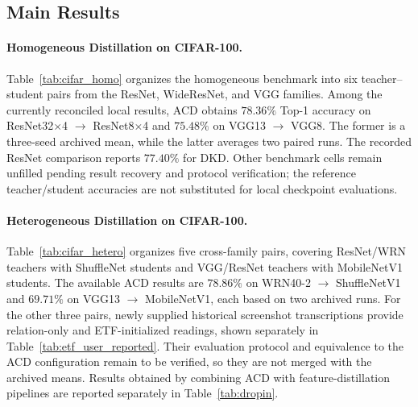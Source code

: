 
\subsection{Main Results}

\paragraph{Homogeneous Distillation on CIFAR-100.}
Table~\ref{tab:cifar_homo} organizes the homogeneous benchmark into
six teacher--student pairs from the ResNet, WideResNet, and VGG families.
Among the currently reconciled local results, ACD obtains $78.36\%$
Top-1 accuracy on ResNet32$\times$4 $\to$ ResNet8$\times$4 and
$75.48\%$ on VGG13 $\to$ VGG8. The former is a three-seed archived
mean, while the latter averages two paired runs.
The recorded ResNet comparison reports $77.40\%$ for DKD.
Other benchmark cells remain unfilled pending result recovery and
protocol verification; the reference teacher/student accuracies
are not substituted for local checkpoint evaluations.

\paragraph{Heterogeneous Distillation on CIFAR-100.}
Table~\ref{tab:cifar_hetero} organizes five cross-family pairs,
covering ResNet/WRN teachers with ShuffleNet students and VGG/ResNet
teachers with MobileNetV1 students.
The available ACD results are $78.86\%$ on WRN40-2 $\to$
ShuffleNetV1 and $69.71\%$ on VGG13 $\to$ MobileNetV1,
each based on two archived runs.
For the other three pairs, newly supplied historical screenshot
transcriptions provide relation-only and ETF-initialized readings,
shown separately in Table~\ref{tab:etf_user_reported}.
Their evaluation protocol and equivalence to the ACD configuration
remain to be verified, so they are not merged with the archived means.
Results obtained by combining ACD with
feature-distillation pipelines are reported separately in
Table~\ref{tab:dropin}.

